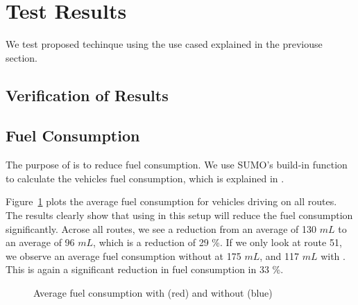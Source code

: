 \section{Test Results}
We test proposed techinque using the use cased explained in the previouse section.

\subsection{Verification of Results}

\subsection{Fuel Consumption}
The purpose of \tech is to reduce fuel consumption. 
We use SUMO's build-in function to calculate the vehicles fuel consumption, which is explained in \cite{SUMOFuel}.

Figure~\ref{tik:fuel:avg} plots the average fuel consumption for vehicles driving on all routes. 
The results clearly show that using \tech in this setup will reduce the fuel consumption significantly.
Acrose all routes, we see a reduction from an average of 130 $mL$ to an average of 96 $mL$, which is a reduction of 29 \%.
If we only look at route 51, we observe an average fuel consumption without \tech at 175 $mL$, and 117 $mL$ with \tech.
This is again a significant reduction in fuel consumption in 33 \%.

%
%

\begin{figure}
\caption{Average fuel consumption with (red) and without \tech (blue)}\label{tik:fuel:avg}
\end{figure}



